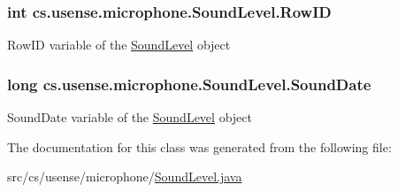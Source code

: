 \subsubsection[{Row\+I\+D}]{\setlength{\rightskip}{0pt plus 5cm}int cs.\+usense.\+microphone.\+Sound\+Level.\+Row\+I\+D}\label{classcs_1_1usense_1_1microphone_1_1_sound_level_a584b392093bc123f79dced993c7b0411}
Row\+I\+D variable of the \hyperlink{classcs_1_1usense_1_1microphone_1_1_sound_level}{Sound\+Level} object \hypertarget{classcs_1_1usense_1_1microphone_1_1_sound_level_a61e9c95e6903a8af2d006e2b3c14a69c}{}
\subsubsection[{Sound\+Date}]{\setlength{\rightskip}{0pt plus 5cm}long cs.\+usense.\+microphone.\+Sound\+Level.\+Sound\+Date}\label{classcs_1_1usense_1_1microphone_1_1_sound_level_a61e9c95e6903a8af2d006e2b3c14a69c}
Sound\+Date variable of the \hyperlink{classcs_1_1usense_1_1microphone_1_1_sound_level}{Sound\+Level} object 

The documentation for this class was generated from the following file\+:\begin{DoxyCompactItemize}
\item 
src/cs/usense/microphone/\hyperlink{_sound_level_8java}{Sound\+Level.\+java}\end{DoxyCompactItemize}
